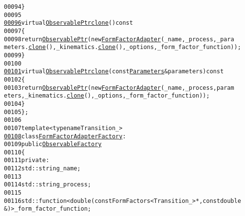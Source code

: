 \begin{footnotesize}
\begin{alltt}
00094             \}
00095 
\hypertarget{form-factor-adapter_8hh_source_l00096}{}\hyperlink{classeos_1_1FormFactorAdapter_a85c062dbc8dd32bb25299fbab92110f5}{00096}             \textcolor{keyword}{virtual} \hyperlink{namespaceeos_a470e5dd806bd129080f1aa0c2954646f}{ObservablePtr} \hyperlink{classeos_1_1FormFactorAdapter_a85c062dbc8dd32bb25299fbab92110f5}{clone}()\textcolor{keyword}{ const}
00097 \textcolor{keyword}{            }\{
00098                 \textcolor{keywordflow}{return} \hyperlink{namespaceeos_a470e5dd806bd129080f1aa0c2954646f}{ObservablePtr}(\textcolor{keyword}{new} \hyperlink{classeos_1_1FormFactorAdapter_a8f300120959a3cbeff31894f2b2fb96c}{FormFactorAdapter}(\_name, \_process, \_para
      meters.\hyperlink{classeos_1_1Parameters_a273f5bad065bc47b62981734a2e3576e}{clone}(), \_kinematics.\hyperlink{classeos_1_1Kinematics_aedd9681136ab3735fb754e2840e10715}{clone}(), \_options, \_form\_factor\_function));
00099             \}
00100 
\hypertarget{form-factor-adapter_8hh_source_l00101}{}\hyperlink{classeos_1_1FormFactorAdapter_a94fdbd805aef594f074e6999616505b5}{00101}             \textcolor{keyword}{virtual} \hyperlink{namespaceeos_a470e5dd806bd129080f1aa0c2954646f}{ObservablePtr} \hyperlink{classeos_1_1FormFactorAdapter_a85c062dbc8dd32bb25299fbab92110f5}{clone}(\textcolor{keyword}{const} \hyperlink{classeos_1_1Parameters}{Parameters} & parameters)\textcolor{keyword}{ const}
00102 \textcolor{keyword}{            }\{
00103                 \textcolor{keywordflow}{return} \hyperlink{namespaceeos_a470e5dd806bd129080f1aa0c2954646f}{ObservablePtr}(\textcolor{keyword}{new} \hyperlink{classeos_1_1FormFactorAdapter_a8f300120959a3cbeff31894f2b2fb96c}{FormFactorAdapter}(\_name, \_process, param
      eters, \_kinematics.\hyperlink{classeos_1_1Kinematics_aedd9681136ab3735fb754e2840e10715}{clone}(), \_options, \_form\_factor\_function));
00104             \}
00105     \};
00106 
00107     \textcolor{keyword}{template} <\textcolor{keyword}{typename} Transition\_>
\hypertarget{form-factor-adapter_8hh_source_l00108}{}\hyperlink{classeos_1_1FormFactorAdapterFactory}{00108}     \textcolor{keyword}{class }\hyperlink{classeos_1_1FormFactorAdapterFactory}{FormFactorAdapterFactory} :
00109         \textcolor{keyword}{public} \hyperlink{classeos_1_1ObservableFactory}{ObservableFactory}
00110     \{
00111         \textcolor{keyword}{private}:
00112             std::string \_name;
00113 
00114             std::string \_process;
00115 
00116             std::function<double (const FormFactors<Transition\_> *, \textcolor{keyword}{const} \textcolor{keywordtype}{double} 
      &)> \_form\_factor\_function;

\end{alltt}
\end{footnotesize}

